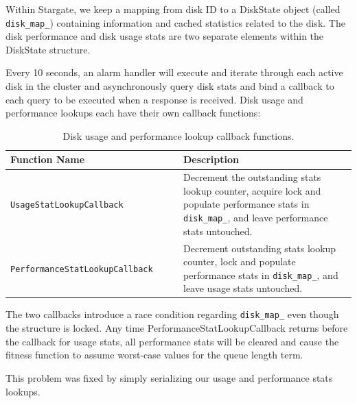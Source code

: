 \documentclass[12pt]{article}
\begin{document}
  Within Stargate, we keep a mapping from disk ID to a DiskState object (called
  \verb|disk_map_|) containing information and cached statistics related to the
  disk. The disk performance and disk usage stats are two separate elements
  within the DiskState structure.

  Every 10 seconds, an alarm handler will execute and iterate through each
  active disk in the cluster and asynchronously query disk stats and bind a
  callback to each query to be executed when a response is received. Disk usage
  and performance lookups each have their own callback functions:

  \begin{table}
    \caption{Disk usage and performance lookup callback functions.}
    \begin{center}
    \begin{tabular}{ | p{0.5\linewidth} | p{0.5\linewidth} | }
      \hline
      \textbf{Function Name} & \textbf{Description} \\ \hline
      \verb|UsageStatLookupCallback| & Decrement the outstanding stats lookup
                                       counter, acquire lock and populate
                                       performance stats in \verb|disk_map_|,
                                       and leave performance stats untouched.
                                       \\ \hline

      \verb|PerformanceStatLookupCallback| & Decrement outstanding stats
                                             lookup counter, lock and
                                             populate performance stats in
                                             \verb|disk_map_|, and leave
                                             usage stats untouched. \\ \hline

      \hline
    \end{tabular}
    \end{center}
  \end{table}

  The two callbacks introduce a race condition regarding \verb|disk_map_| even
  though the structure is locked. Any time PerformanceStatLookupCallback
  returns before the callback for usage stats, all performance stats will be
  cleared and cause the fitness function to assume worst-case values for the
  queue length term.

  This problem was fixed by simply serializing our usage and performance stats
  lookups.
\end{document}
